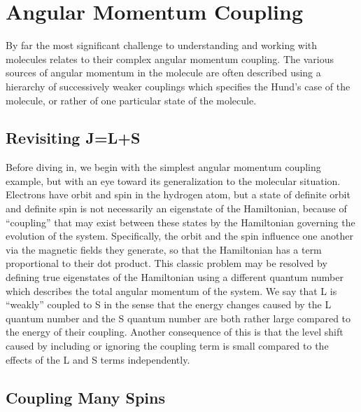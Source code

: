 \section{Angular Momentum Coupling}

By far the most significant challenge to understanding and working with molecules relates to their complex angular momentum coupling. 
The various sources of angular momentum in the molecule are often described using a hierarchy of successively weaker couplings which specifies the Hund's case of the molecule, or rather of one particular state of the molecule.


\subsection{Revisiting J=L+S}

Before diving in, we begin with the simplest angular momentum coupling example, but with an eye toward its generalization to the molecular situation.
Electrons have orbit and spin in the hydrogen atom, but a state of definite orbit and definite spin is not necessarily an eigenstate of the Hamiltonian, because of ``coupling'' that may exist between these states by the Hamiltonian governing the evolution of the system.
Specifically, the orbit and the spin influence one another via the magnetic fields they generate, so that the Hamiltonian has a term proportional to their dot product.
This classic problem may be resolved by defining true eigenstates of the Hamiltonian using a different quantum number which describes the total angular momentum of the system.
We say that L is ``weakly'' coupled to S in the sense that the energy changes caused by the L quantum number and the S quantum number are both rather large compared to the energy of their coupling.
Another consequence of this is that the level shift caused by including or ignoring the coupling term is small compared to the effects of the L and S terms independently.

\subsection{Coupling Many Spins}

